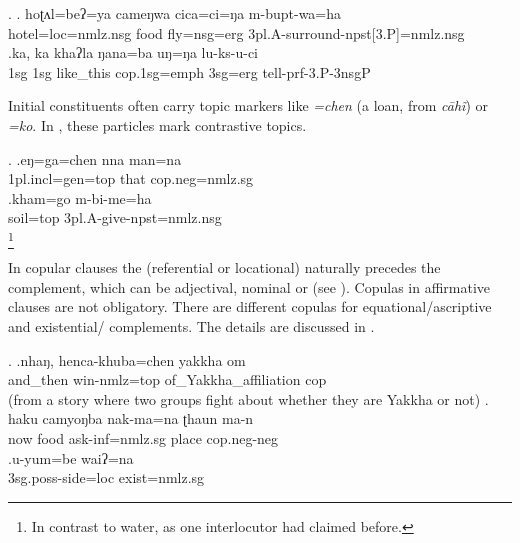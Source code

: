 \ex. \ag.   hoʈʌl=beʔ=ya          cameŋwa  cica=ci=ŋa      m-bupt-wa=ha\\
hotel{\sc =loc=nmlz.nsg} food fly{\sc =nsg=erg} {\sc 3pl.A-}surround{\sc -npst[3.P]=nmlz.nsg}\\
 
\bg.ka,  ka  khaʔla   ŋana=ba                uŋ=ŋa   lu-ks-u-ci\\
{\sc 1sg} {\sc 1sg} like\_this {\sc cop.1sg=emph} {\sc 3sg=erg} tell{\sc -prf-3.P-3nsgP}\\
 
 
 Initial constituents often carry topic markers  like \emph{=chen} (a  loan, from  \emph{cāhĩ}) or \emph{=ko}. In \Next, these particles mark  contrastive topics.
 
 \ex. \ag.eŋ=ga=chen                nna  man=na\\
 {\sc 1pl.incl=gen=top} that  {\sc cop.neg=nmlz.sg}\\
   
 \bg.kham=go     m-bi-me=ha\\
 soil{\sc =top} {\sc 3pl.A-}give{\sc -npst=nmlz.nsg}\\
 \footnote{In contrast to water, as one interlocutor had claimed before.}
 
 In copular clauses the (referential or locational) naturally precedes the complement, which can be adjectival, nominal or  (see \Next). Copulas in affirmative clauses are not obligatory. There are different copulas for equational/ascriptive  and existential/ complements. The details are discussed in . 
 
 \ex. \ag.nhaŋ,    henca-khuba=chen  yakkha          om\\
 and\_then win{\sc -nmlz=top} of\_Yakkha\_affiliation {\sc cop}\\
  (from a story where two groups fight about whether they are Yakkha or not) 
   	\bg.  haku        camyoŋba  nak-ma=na               ʈhaun ma-n\\
		now food ask{\sc -inf=nmlz.sg} place {\sc cop.neg-neg}\\
	 
	\bg.u-yum=be waiʔ=na\\
	{\sc 3sg.poss-}side{\sc =loc} exist{\sc [3]=nmlz.sg}\\
	
